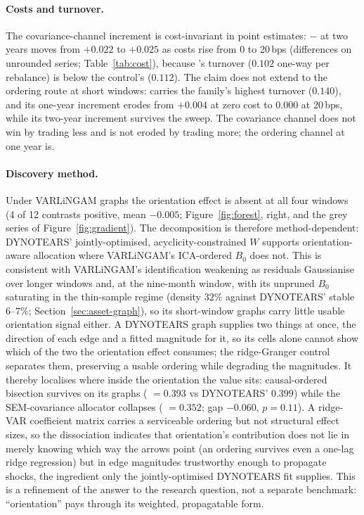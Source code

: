 \paragraph{Costs and turnover.} The covariance-channel increment is
cost-invariant in point estimates: \skelsem{}$-$\skelsamp{} at two years
moves from $+0.022$ to $+0.025$ as
costs rise from 0 to 20\,bps (differences on unrounded series;
Table~\ref{tab:cost}), because \skelsem{}'s turnover ($0.102$
one-way per
rebalance) is below the control's ($0.112$). The claim does not extend
to the ordering route at short windows: \orientsem{} carries the
family's highest turnover ($0.140$), and its one-year increment erodes
from $+0.004$ at zero cost to $0.000$ at 20\,bps, while its two-year
increment survives the sweep. The covariance channel does not win by
trading less and is not eroded by trading more; the ordering channel at
one year is.

\paragraph{Discovery method.} Under VARLiNGAM graphs the orientation effect
is absent at all four windows (4 of 12 contrasts positive, mean $-0.005$;
Figure~\ref{fig:forest}, right, and the grey series of
Figure~\ref{fig:gradient}). The decomposition is therefore
method-dependent: DYNOTEARS' jointly-optimised, acyclicity-constrained
$W$ supports orientation-aware allocation where VARLiNGAM's ICA-ordered
$B_0$ does not. This is consistent with VARLiNGAM's identification
weakening as
residuals Gaussianise over longer windows and, at the nine-month window,
with its unpruned $B_0$ saturating in the thin-sample regime (density
$32\%$ against DYNOTEARS' stable $6$--$7\%$;
Section~\ref{sec:asset-graph}),
so its short-window graphs carry little usable orientation signal either.
A DYNOTEARS graph supplies two things at once, the direction of each
edge and a fitted magnitude for it, so its cells alone cannot show which
of the two the orientation effect consumes; the ridge-Granger control
separates them, preserving a usable ordering while degrading the
magnitudes. It thereby localises where inside
the orientation the value sits: causal-ordered bisection survives on its
graphs (\orientsamp{} $=0.393$ vs DYNOTEARS' $0.399$) while the
SEM-covariance
allocator collapses (\skelsem{} $=0.352$; gap $-0.060$,
$p=0.11$). A ridge-VAR coefficient matrix carries a serviceable
ordering but not structural effect sizes, so the dissociation indicates
that orientation's contribution does not lie in merely knowing which way
the
arrows point (an ordering survives even a one-lag ridge regression)
but in edge magnitudes trustworthy enough to propagate shocks, the
ingredient only the jointly-optimised DYNOTEARS fit supplies. This is a
refinement of the answer to the research question, not a separate benchmark: ``orientation''
pays through its weighted, propagatable form.

